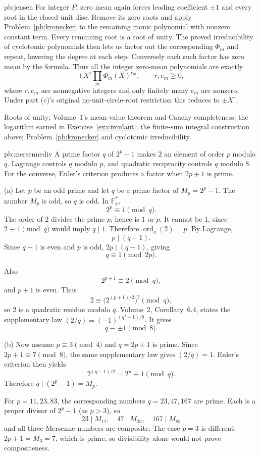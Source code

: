 \begin{solution}{pb:jensen}
For integer $P$, zero mean again forces leading coefficient $\pm1$ and
every root in the closed unit disc. Remove its zero roots and apply
Problem~\ref{pb:kronecker} to the remaining monic polynomial with nonzero
constant term. Every remaining root is a root of unity. The proved
irreducibility of cyclotomic polynomials then lets us factor out the
corresponding $\Phi_m$ and repeat, lowering the degree at each step.
Conversely each such factor has zero mean by the formula. Thus all the
integer zero-mean polynomials are exactly
\[
\boxed{\pm X^r\prod_m\Phi_m(X)^{e_m},\qquad r,e_m\ge0,}
\]
where $r,e_m$ are nonnegative integers and only finitely many $e_m$ are nonzero. Under part (c)'s original
no-unit-circle-root restriction this reduces to $\pm X^r$.

\tools Roots of unity; Volume~1's mean-value theorem and Cauchy completeness; the logarithm earned in Exercise~\ref{ex:circulant}; the finite-sum integral construction above; Problem~\ref{pb:kronecker} and cyclotomic irreducibility.
\end{solution}

\begin{solution}{pb:mersennediv}
\idea A prime factor $q$ of $2^p-1$ makes $2$ an element of order $p$ modulo $q$. Lagrange controls $q$ modulo $p$, and quadratic reciprocity controls $q$ modulo $8$. For the converse, Euler's criterion produces a factor when $2p+1$ is prime.

\writeup (a) Let $p$ be an odd prime and let $q$ be a prime factor of $M_p=2^p-1$. The number $M_p$ is odd, so $q$ is odd. In $\mathbb F_q^*$,
\[
2^p\equiv1\pmod q.
\]
The order of $2$ divides the prime $p$, hence is $1$ or $p$. It cannot be $1$, since $2\equiv1\pmod q$ would imply $q\mid1$. Therefore $\operatorname{ord}_q(2)=p$. By Lagrange,
\[
p\mid(q-1).
\]
Since $q-1$ is even and $p$ is odd, $2p\mid(q-1)$, giving
\[
\boxed{q\equiv1\pmod{2p}}.
\]

Also
\[
2^{p+1}\equiv2\pmod q,
\]
and $p+1$ is even. Thus
\[
2\equiv\bigl(2^{(p+1)/2}\bigr)^2\pmod q,
\]
so $2$ is a quadratic residue modulo $q$. Volume~2, Corollary~6.4, states the supplementary law $(2/q)=(-1)^{(q^2-1)/8}$. It gives
\[
\boxed{q\equiv\pm1\pmod8}.
\]

(b) Now assume $p\equiv3\pmod4$ and $q=2p+1$ is prime. Since $2p+1\equiv7\pmod8$, the same supplementary law gives $(2/q)=1$. Euler's criterion then yields
\[
2^{(q-1)/2}=2^p\equiv1\pmod q.
\]
Therefore $q\mid(2^p-1)=M_p$.

For $p=11,23,83$, the corresponding numbers $q=23,47,167$ are prime. Each is a proper divisor of $2^p-1$ (as $p>3$), so
\[
\boxed{23\mid M_{11},\quad47\mid M_{23},\quad167\mid M_{83}}
\]
and all three Mersenne numbers are composite. The case $p=3$ is different: $2p+1=M_3=7$, which is prime, so divisibility alone would not prove compositeness.
\end{solution}

